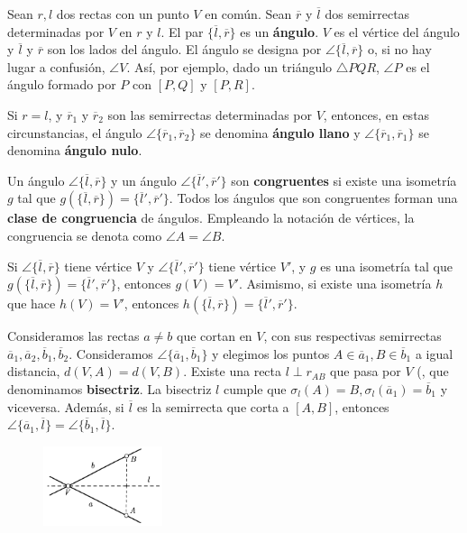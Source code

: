  Sean $r,l$ dos rectas con un punto $V$ en común. Sean $\overline{r}$ y $\overline{l}$ dos semirrectas determinadas por $V$ en $r$ y $l$. El par $\{\overline{l}, \overline{r} \}$ es un \textbf{ángulo}. $V$ es el vértice del ángulo y $\overline{l}$ y $\overline{r}$ son los lados del ángulo. El ángulo se designa por $\angle \{\overline{l}, \overline{r} \}$ o, si no hay lugar a confusión, $\angle V$. Así, por ejemplo, dado un triángulo $\triangle PQR$, $\angle P$ es el ángulo formado por $P$ con $[P,Q]$ y $[P,R]$.

 Si $r = l$, y $\overline{r}_1$ y $\overline{r}_2$ son las semirrectas determinadas por $V$, entonces, en estas circunstancias, el ángulo $\angle\{ \overline{r}_1, \overline{r}_2 \}$ se denomina \textbf{ángulo llano} y $\angle\{ \overline{r}_1, \overline{r}_1 \}$ se denomina \textbf{ángulo nulo}.

 Un ángulo $\angle \{\overline{l}, \overline{r} \}$ y un ángulo $\angle \{\overline{l}', \overline{r}' \}$ son \textbf{congruentes} si existe una isometría $g$ tal que $g(\{\overline{l}, \overline{r} \}) = \{\overline{l}', \overline{r}'\} $. Todos los ángulos que son congruentes forman una \textbf{clase de congruencia} de ángulos. Empleando la notación de vértices, la congruencia se denota como $\angle A = \angle B$.

 Si  $\angle \{\overline{l}, \overline{r} \}$ tiene vértice $V$ y  $\angle \{\overline{l}', \overline{r}' \}$ tiene vértice $V'$, y $g$ es una isometría tal que $g(  \{\overline{l}, \overline{r} \}) =   \{\overline{l}', \overline{r}' \}$, entonces $g(V) = V'$. Asimismo, si existe una isometría $h$ que hace $h(V) = V'$, entonces  $h(  \{\overline{l}, \overline{r} \}) =   \{\overline{l}', \overline{r}' \}$.

 Consideramos las rectas $a \neq b$ que cortan en $V$, con sus respectivas semirrectas 
$\overline{a}_1, \overline{a}_2, \overline{b}_1, \overline{b}_2$. Consideramos $\angle \{\overline{a}_1, \overline{b}_1 \}$ y elegimos los puntos $A \in \overline{a}_1, B \in \overline{b}_1$ a igual distancia, $d(V,A) = d(V,B)$. Existe una recta $l \perp r_{AB}$ que pasa por $V$ (, que denominamos \textbf{bisectriz}. La bisectriz $l$ cumple que $\sigma_l(A) = B, \sigma_l(\overline{a}_1) = \overline{b}_1$ y viceversa. Además, si $\overline{l}$ es la semirrecta que corta a $[A,B]$, entonces $\angle \{\overline{a}_1, \overline{l} \} = \angle \{\overline{b}_1, \overline{l} \}$.

\begin{figure}[H]
	\centering
	\includegraphics[width=3.5cm]{figuras/4-9.png}
	\vspace{-1em}
\end{figure}

